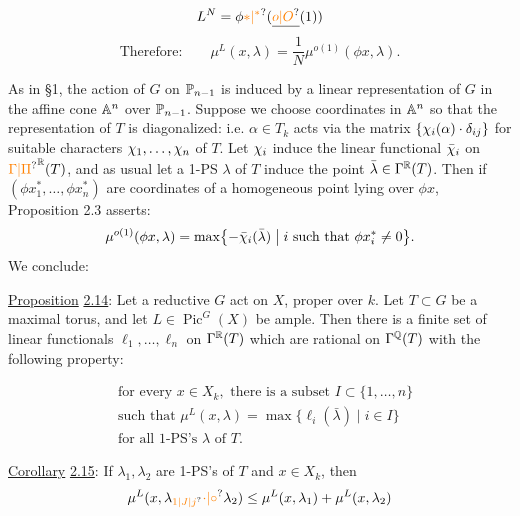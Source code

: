 \[
 L^{N}=\phi\unsure{\ast|{}^{*}}(\underline{\unsure{o|O}}(1))
\]
\[
 \text{Therefore:}\qquad \mu^{L}(x,\lambda)=\frac{1}{N}\mu^{o(1)}(\phi x,\lambda).
\]

As in \S1, the action of $G$ on $\mathbb{P}_{n-1}$ is induced by a linear representation of $G$ in the affine cone $\mathbb{A}^{n}$ over $\mathbb{P}_{n-1}$. Suppose we choose coordinates in $\mathbb{A}^{n}$ so that the representation of $T$ is diagonalized: i.e. $\alpha\in T_k$ acts via the matrix $\{\chi_i(\alpha)\cdot\delta_{ij}\}$ for suitable characters $\chi_1,\ldots,\chi_n$ of $T$. Let $\chi_i$ induce the linear functional $\bar{\chi}_i$ on $\unsure{\Gamma|\Pi}^{\handwritten{\mathbb{R}}}(T)$, and as usual let a 1-PS $\lambda$ of $T$ induce the point $\bar{\lambda}\in\Gamma^{\mathbb{R}}(T)$. Then if $(\phi x_1^*,\ldots,\phi x_n^*)$ are coordinates of a homogeneous point lying over $\phi x$, Proposition 2.3 asserts:
\[
 \mu^{o(1)}(\phi x,\lambda)=\max\bigl\{-\bar{\chi}_i(\bar{\lambda})\bigm|i\text{ such that }\phi x_i^*\neq 0\bigr\}.
\]
We conclude:

\uline{Proposition} \uline{2.14}: Let a reductive $G$ act on $X$, proper over $k$. Let $T\subset G$ be a maximal torus, and let $L\in\operatorname{Pic}^{G}(X)$ be ample. Then there is a finite set of linear functionals $\ell_1,\ldots,\ell_n$ on $\Gamma^{\mathbb{R}}(T)$ which are rational on $\Gamma^{\mathbb{Q}}(T)$ with the following property:

\[
\begin{aligned}
&\text{for every }x\in X_k,\text{ there is a subset }I\subset\{1,\ldots,n\}\\
&\text{such that }\mu^{L}(x,\lambda)=\max\{\ell_i(\bar{\lambda})\mid i\in I\}\\
&\text{for all 1-PS's }\lambda\text{ of }T.
\end{aligned}
\]

\uline{Corollary} \uline{2.15}: If $\lambda_1,\lambda_2$ are 1-PS's of $T$ and $x\in X_k$, then
\[
 \mu^{L}(x,\lambda_{\unsure{1|J|j}}\unsure{\cdot|\circ}\lambda_2)\leq\mu^{L}(x,\lambda_1)+\mu^{L}(x,\lambda_2)
\]

